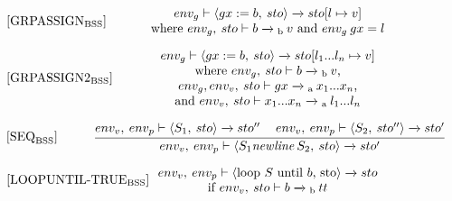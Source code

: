 \begin{equation}
\begin{minipage}{.2\linewidth}
$[\text{GRPASSIGN}_\text{BSS}]$
\end{minipage}
\begin{minipage}{.8\linewidth}
\centering
$env_g \vdash \langle gx := b, \: sto \rangle \xrightarrow{} sto[l \mapsto v]$
\\
where $env_g, \: sto \vdash b \xrightarrow{}\textsubscript{b} \: v$ and $env_g \: gx = l$
\end{minipage}
\end{equation}

\begin{equation}
\begin{minipage}{.2\linewidth}
$[\text{GRPASSIGN2}_\text{BSS}]$
\end{minipage}
\begin{minipage}{.8\linewidth}
\centering
$env_g \vdash \langle gx := b, \: sto \rangle \xrightarrow{} sto[l_1 ... l_n \mapsto v]$
\\
where $env_g, \: sto \vdash b \xrightarrow{}\textsubscript{b} \: v$,
\\$env_g, env_v, \: sto \vdash gx \xrightarrow{}\textsubscript{a} \: x_1...x_n$,
\\
and $env_v, \: sto \vdash x_1...x_n \xrightarrow{}\textsubscript{a} \: l_1... l_n$
\end{minipage}
\end{equation}


\begin{equation}
\begin{minipage}{.2\linewidth}
$[\text{SEQ}_\text{BSS}]$
\end{minipage}
\begin{minipage}{.8\linewidth}
\centering
$\cfrac{env_v, \: env_p \vdash \langle S_1, \: sto\rangle \xrightarrow{} sto'' \quad\: env_v, \: env_p \vdash \langle S_2, \: sto'' \rangle \xrightarrow{} sto'}{env_v, \: env_p \vdash \langle S_1 \textit{newline} \: S_2, \: sto \rangle \xrightarrow{} sto'}$ 
\end{minipage}
\end{equation}

\begin{equation}
\begin{minipage}{.2\linewidth}
$[\text{LOOPUNTIL-TRUE}_\text{BSS}]$
\end{minipage}
\begin{minipage}{.8\linewidth}
\centering
$env_v, \: env_p \vdash \langle $loop $S$ until $b$, sto$\rangle \xrightarrow{} sto$ \\
if $env_v, \: sto \vdash b \xrightarrow{}\textsubscript{b} \: tt$ 
\end{minipage}
\end{equation}

